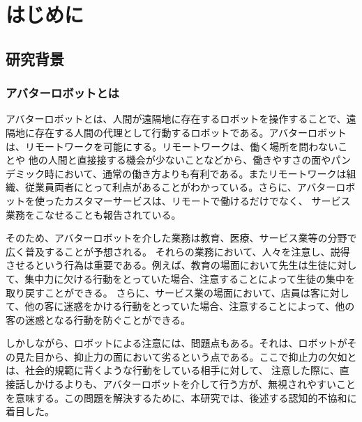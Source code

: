 \documentclass[11pt,a4j]{jreport}
\begin{document}

\tableofcontents

\pagestyle{fancy}
\lhead{\rightmark}
\renewcommand{\chaptermark}[1]{\markboth{第\ \normalfont\thechapter\ 章~~#1}{}}

\chapter{はじめに} %

\section{研究背景} %
\subsection{アバターロボットとは} %
アバターロボットとは、人間が遠隔地に存在するロボットを操作することで、遠隔地に存在する人間の代理として行動するロボットである。アバターロボットは、リモートワークを可能にする。リモートワークは、働く場所を問わないことや
他の人間と直接接する機会が少ないことなどから、働きやすさの面やパンデミック時において、通常の働き方よりも有利である。またリモートワークは組織、従業員両者にとって利点があることがわかっている\cite{FERREIRA202170}。さらに、アバターロボットを使ったカスタマーサービスは、リモートで働けるだけでなく、
サービス業務をこなせることも報告されている\cite{Kanda2010}。

そのため、アバターロボットを介した業務は教育、医療、サービス業等の分野で広く普及することが予想される。
それらの業務において、人々を注意し、説得させるという行為は重要である。例えば、教育の場面において先生は生徒に対して、集中力に欠ける行動をとっていた場合、注意することによって生徒の集中を取り戻すことができる。
さらに、サービス業の場面において、店員は客に対して、他の客に迷惑をかける行動をとっていた場合、注意することによって、他の客の迷惑となる行動を防ぐことができる。


しかしながら、ロボットによる注意には、問題点もある。それは、ロボットがその見た目から、抑止力の面において劣るという点である。ここで抑止力の欠如とは、社会的規範に背くような行動をしている相手に対して、
注意した際に、直接話しかけるよりも、アバターロボットを介して行う方が、無視されやすいことを意味する。この問題を解決するために、本研究では、後述する認知的不協和に着目した。
\end{document}
